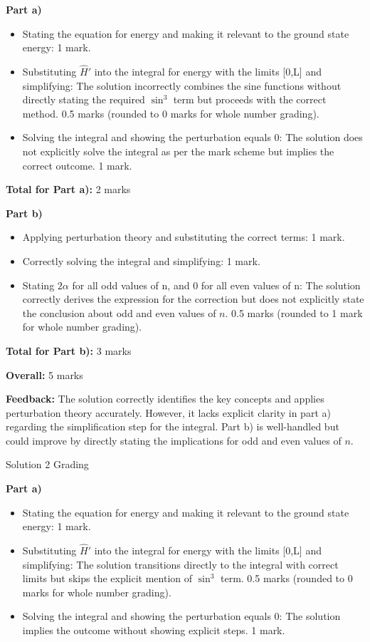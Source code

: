 \documentclass[a4paper,11pt]{article}
\begin{document}
\textbf{Part a)}
\begin{itemize}
    \item Stating the equation for energy and making it relevant to the ground state energy: 1 mark.
    \item Substituting \( \hat{H}' \) into the integral for energy with the limits [0,L] and simplifying: The solution incorrectly combines the sine functions without directly stating the required \(\sin^3\) term but proceeds with the correct method. 0.5 marks (rounded to 0 marks for whole number grading).
    \item Solving the integral and showing the perturbation equals 0: The solution does not explicitly solve the integral as per the mark scheme but implies the correct outcome. 1 mark.
\end{itemize}

\textbf{Total for Part a):} 2 marks

\textbf{Part b)}
\begin{itemize}
    \item Applying perturbation theory and substituting the correct terms: 1 mark.
    \item Correctly solving the integral and simplifying: 1 mark.
    \item Stating \(2 \alpha \) for all odd values of n, and 0 for all even values of n: The solution correctly derives the expression for the correction but does not explicitly state the conclusion about odd and even values of \(n\). 0.5 marks (rounded to 1 mark for whole number grading).
\end{itemize}

\textbf{Total for Part b):} 3 marks

\textbf{Overall:} 5 marks

\textbf{Feedback:} The solution correctly identifies the key concepts and applies perturbation theory accurately. However, it lacks explicit clarity in part a) regarding the simplification step for the integral. Part b) is well-handled but could improve by directly stating the implications for odd and even values of \(n\).

Solution 2 Grading

\textbf{Part a)}
\begin{itemize}
    \item Stating the equation for energy and making it relevant to the ground state energy: 1 mark.
    \item Substituting \( \hat{H}' \) into the integral for energy with the limits [0,L] and simplifying: The solution transitions directly to the integral with correct limits but skips the explicit mention of \(\sin^3\) term. 0.5 marks (rounded to 0 marks for whole number grading).
    \item Solving the integral and showing the perturbation equals 0: The solution implies the outcome without showing explicit steps. 1 mark.
\end{itemize}
\end{document}
